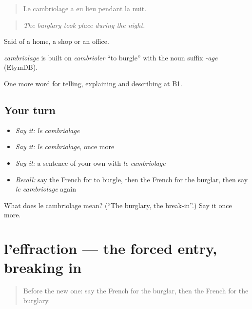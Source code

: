\begin{quote}
Le cambriolage a eu lieu pendant la nuit.
\end{quote}

\begin{quote}
\emph{The burglary took place during the night.}
\end{quote}

Said of a home, a shop or an office.

\begin{cousinweb}
\emph{cambriolage} is built on \emph{cambrioler} \textquotedblleft{}to burgle\textquotedblright{} with the noun suffix \emph{-age} (EtymDB).
\end{cousinweb}

\begin{grammarlens}[title={What you've built}]
One more word for telling, explaining and describing at B1.
\end{grammarlens}

\subsection*{Your turn}
\begin{itemize}
\raggedright
  \item \emph{Say it:} \emph{le cambriolage}
  \item \emph{Say it:} \emph{le cambriolage}, once more
  \item \emph{Say it:} a sentence of your own with \emph{le cambriolage}
  \item \emph{Recall:} say the French for to burgle, then the French for the burglar, then say \emph{le cambriolage} again
\end{itemize}

\begin{tcolorbox}[breakable,colback=teal!4,colframe=teal!35!black,title={Before you move on}]
What does le cambriolage mean? (\textquotedblleft{}The burglary, the break-in\textquotedblright{}.) Say it once more.
\end{tcolorbox}
\section[l'effraction]{l'effraction — the forced entry, breaking in}

\label{lesson:FR-C287-effraction}



\begin{quote}
Before the new one: say the French for the burglar, then the French for the burglary.
\end{quote}

